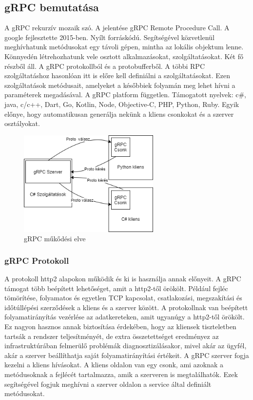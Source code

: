 \documentclass[
]{thesis-ekf}
\theoremstyle{definition}
\theoremstyle{remark}
\begin{document}
\subsection{gRPC bemutatása}
A gRPC rekurzív mozaik szó. A jelentése gRPC Remote Procedure Call. A google fejlesztette 2015-ben. Nyílt forráskódú. Segítségével közvetlenül meghívhatunk metódusokat egy távoli gépen, mintha az lokális objektum lenne. Könnyedén létrehozhatunk vele osztott alkalmazásokat, szolgáltatásokat. Két fő részből áll. A gRPC protokollból és a protobufferből. A többi RPC szolgáltatáshoz hasonlóan itt is előre kell definiálni a szolgáltatásokat. Ezen szolgáltatások metódusait, amelyeket a későbbiek folyamán meg lehet hívni a paraméterek megadásával. A gRPC platform független. Támogatott nyelvek: c\#, java, c/c++, Dart, Go, Kotlin, Node, Objective-C, PHP, Python, Ruby. Egyik előnye, hogy automatikusan generálja nekünk a kliens csonkokat és a szerver osztályokat.\cite{grpc}
\begin{figure}[th!]
	\centering
	\includegraphics[width=7cm]{proto}
		\caption[gRPC]{gRPC műkődési elve \cite{grpc}}
	\label{fig:proto}
\end{figure}

\subsubsection {gRPC Protokoll}
A protokoll http2 alapokon működik és ki is használja annak előnyeit. A gRPC támogat több beépített lehetőséget, amit a http2-től örökölt. Például fejléc tömörítése, folyamatos és egyetlen TCP kapcsolat, csatlakozási, megszakítási és időtúllépési szerződések a kliens és a szerver között. A protokollnak van beépített folyamatirányítás vezérlése az adatkereteken, amit ugyanúgy a http2-től örökölt. Ez nagyon hasznos annak biztosítása érdekében, hogy az kliensek tiszteletben tartsák a rendszer teljesítményét, de extra összetettséget eredményez az infrastruktúrában felmerülő problémák diagnosztizálásakor, mivel akár az ügyfél, akár a szerver beállíthatja saját folyamatirányítási értékeit. A gRPC szerver fogja kezelni a kliens hívásokat. A kliens oldalon van egy csonk, ami azoknak a metódusoknak a fejlécét tartalmazza, amik a szerveren is megtalálhatók. Ezek segítségével fogjuk meghívni a szerver oldalon a service által definiált metódusokat. \cite{grpcprotokol}
\end{document}
